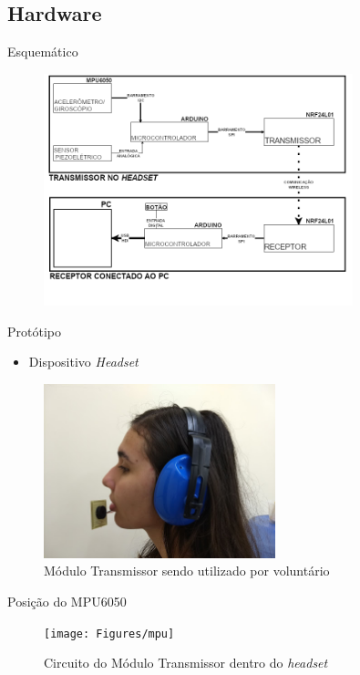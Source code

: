 \subsection{Hardware}


\begin{frame}{Esquem\'atico}

\begin{figure}
	\includegraphics[width=0.8\textwidth]{Figures/prototipo_full}
\end{figure}

\end{frame}
\begin{frame}{Prot\'otipo}
\begin{itemize}
    \item Dispositivo \textit{Headset}
\end{itemize}

\begin{figure}
	\includegraphics[width=0.6\textwidth]{Figures/voluntario_prototipo}\quad
	\caption{M\'odulo Transmissor sendo utilizado por volunt\'ario}
\end{figure}

\end{frame}
\begin{frame}{Posi\c c\~ao do MPU6050}

\begin{figure}
	\texttt{[image: Figures/mpu]}\quad
    \caption{Circuito do M\'odulo Transmissor dentro do \textit{headset}}
\end{figure}

\end{frame}

